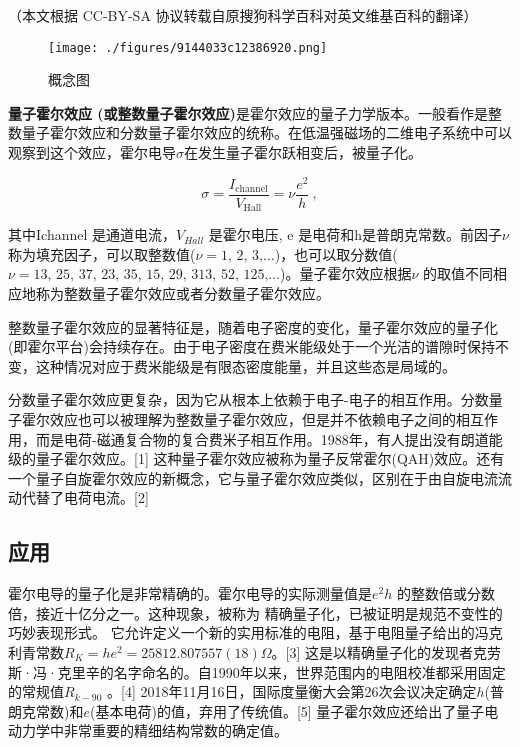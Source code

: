 
（本文根据 CC-BY-SA 协议转载自原搜狗科学百科对英文维基百科的翻译）

\begin{figure}[ht]
\centering
\texttt{[image: ./figures/9144033c12386920.png]}
\caption{概念图} \label{fig_LZHRXY_3}
\end{figure}

\textbf{量子霍尔效应 (或整数量子霍尔效应)}是霍尔效应的量子力学版本。一般看作是整数量子霍尔效应和分数量子霍尔效应的统称。在低温强磁场的二维电子系统中可以观察到这个效应，霍尔电导$\sigma$在发生量子霍尔跃相变后，被量子化。

\begin{equation}
\sigma = \frac{I_{\text{channel}}}{V_{\text{Hall}}} = \nu \frac{e^2}{h}~,
\end{equation}

其中Ichannel 是通道电流，$V_{Hall}$ 是霍尔电压, e 是电荷和h是普朗克常数。前因子$\nu$ 称为填充因子，可以取整数值($\nu =\text{1, 2, 3,…}$)，也可以取分数值( $\nu=\text{13, 25, 37, 23, 35, 15, 29, 313, 52, 125,…}$)。量子霍尔效应根据$\nu$ 的取值不同相应地称为整数量子霍尔效应或者分数量子霍尔效应。

整数量子霍尔效应的显著特征是，随着电子密度的变化，量子霍尔效应的量子化(即霍尔平台)会持续存在。由于电子密度在费米能级处于一个光洁的谱隙时保持不变，这种情况对应于费米能级是有限态密度能量，并且这些态是局域的。

分数量子霍尔效应更复杂，因为它从根本上依赖于电子-电子的相互作用。分数量子霍尔效应也可以被理解为整数量子霍尔效应，但是并不依赖电子之间的相互作用，而是电荷-磁通复合物的复合费米子相互作用。1988年，有人提出没有朗道能级的量子霍尔效应。[1] 这种量子霍尔效应被称为量子反常霍尔(QAH)效应。还有一个量子自旋霍尔效应的新概念，它与量子霍尔效应类似，区别在于由自旋电流流动代替了电荷电流。[2]

\subsection{应用}
霍尔电导的量子化是非常精确的。霍尔电导的实际测量值是$e^2h$ 的整数倍或分数倍，接近十亿分之一。这种现象，被称为 精确量子化，已被证明是规范不变性的巧妙表现形式。 它允许定义一个新的实用标准的电阻，基于电阻量子给出的冯克利青常数$R_K = he^2 = 25812.807557(18)\Omega$。[3] 这是以精确量子化的发现者克劳斯·冯·克里辛的名字命名的。自1990年以来，世界范围内的电阻校准都采用固定的常规值$R_{k-90}$ 。[4] 2018年11月16日，国际度量衡大会第26次会议决定确定$h$(普朗克常数)和$e$(基本电荷)的值，弃用了传统值。[5] 量子霍尔效应还给出了量子电动力学中非常重要的精细结构常数的确定值。

